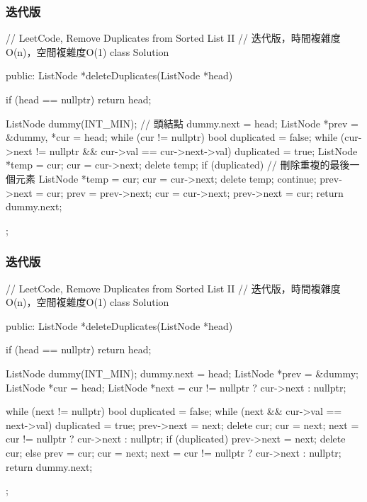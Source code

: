 \subsubsection{迭代版}
\begin{Code}
// LeetCode, Remove Duplicates from Sorted List II
// 迭代版，時間複雜度O(n)，空間複雜度O(1)
class Solution {
public:
    ListNode *deleteDuplicates(ListNode *head) {
        if (head == nullptr) return head;

        ListNode dummy(INT_MIN); // 頭結點
        dummy.next = head;
        ListNode *prev = &dummy, *cur = head;
        while (cur != nullptr) {
            bool duplicated = false;
            while (cur->next != nullptr && cur->val == cur->next->val) {
                duplicated = true;
                ListNode *temp = cur;
                cur = cur->next;
                delete temp;
            }
            if (duplicated) { // 刪除重複的最後一個元素
                ListNode *temp = cur;
                cur = cur->next;
                delete temp;
                continue;
            }
            prev->next = cur;
            prev = prev->next;
            cur = cur->next;
        }
        prev->next = cur;
        return dummy.next;
    }
};
\end{Code}


\subsubsection{迭代版}
\begin{Code}
// LeetCode, Remove Duplicates from Sorted List II
// 迭代版，時間複雜度O(n)，空間複雜度O(1)
class Solution {
public:
    ListNode *deleteDuplicates(ListNode *head) {
        if (head == nullptr) return head;

        ListNode dummy(INT_MIN); dummy.next = head;
        ListNode *prev = &dummy;
        ListNode *cur = head;
        ListNode *next = cur != nullptr ? cur->next : nullptr;

        while (next != nullptr) {
            bool duplicated = false;
            while (next && cur->val == next->val) {
                duplicated = true;
                prev->next = next;
                delete cur;
                cur = next;
                next = cur != nullptr ? cur->next : nullptr;
            }
            if (duplicated) {
                prev->next = next;
                delete cur;
            }
            else
                prev = cur;
            cur = next;
            next = cur != nullptr ? cur->next : nullptr;
        }
        return dummy.next;
    }
};


\end{Code}
